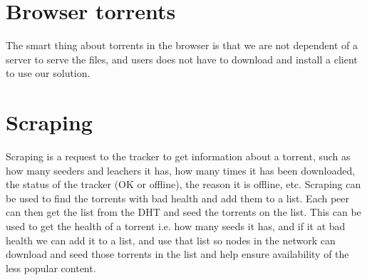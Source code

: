 \section{Browser torrents}
The smart thing about torrents in the browser is that we are not dependent of a server to serve the files, and users does not have to download and install a client to use our solution.

\section{Scraping}
Scraping is a request to the tracker to get information about a torrent, such as how many seeders and leachers it has, how many times it has been downloaded, the status of the tracker (OK or offline), the reason it is offline, etc.
Scraping can be used to find the torrents with bad health and add them to a list. Each peer can then get the list from the \acs{DHT} and seed the torrents on the list.
This can be used to get the health of a torrent i.e. how many seeds it has, and if it at bad health we can add it to a list, and use that list so nodes in the network can download and seed those torrents in the list and help ensure availability of the less popular content.
